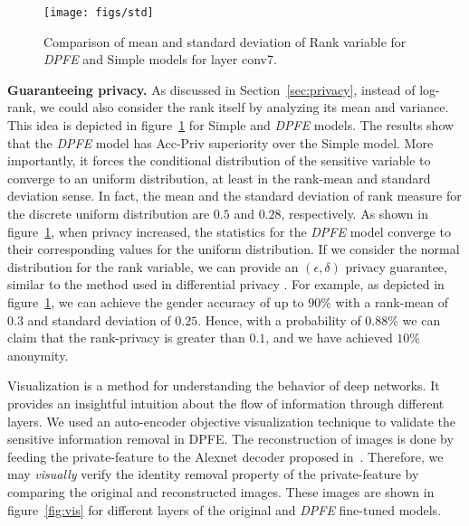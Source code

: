 \documentclass[10pt,journal,compsoc]{IEEEtran}
\begin{document}
\begin{figure}[!h]
	\centering
	\texttt{[image: figs/std]}
	\caption{Comparison of mean and standard deviation of Rank variable for \emph{DPFE} and Simple models for layer conv7.}
	\label{fig:std_comparison}
\end{figure}\textbf{Guaranteeing privacy.} As discussed in Section~\ref{sec:privacy}, instead of log-rank, we could also consider the rank itself by analyzing its mean and variance. This idea is depicted in figure~\ref{fig:std_comparison} for Simple and \emph{DPFE} models. The results show that the \emph{DPFE} model has Acc-Priv superiority over the Simple model. More importantly, it forces the conditional distribution of the sensitive variable to converge to an uniform distribution, at least in the rank-mean and standard deviation sense. In fact, the mean and the standard deviation of rank measure for the discrete uniform distribution are $0.5$ and $0.28$, respectively. As shown in figure~\ref{fig:std_comparison}, when privacy increased, the statistics for the \emph{DPFE} model converge to their corresponding values for the uniform distribution. If we consider the normal distribution for the rank variable, we can provide an $(\epsilon,\delta)$ privacy guarantee, similar to the method used in differential privacy \cite{dwork06}. For example, as depicted in figure~\ref{fig:std_comparison}, we can achieve the gender accuracy of up to $90\%$ with a rank-mean of $0.3$ and standard deviation of $0.25$. Hence, with a probability of $0.88\%$ we can claim that the rank-privacy is greater than $0.1$, and we have achieved $10\%$ anonymity.


Visualization is a method for understanding the behavior of deep networks. It provides an insightful intuition about the flow of information through different layers. We used an auto-encoder objective visualization technique \cite{dosovitskiy2016} to validate the sensitive information removal in DPFE. %
The reconstruction of images is done by feeding the private-feature to the Alexnet decoder proposed in~\cite{dosovitskiy2016}. Therefore, we may \emph{visually} verify the identity removal property of the private-feature by comparing the original and reconstructed images. These images are shown in figure~\ref{fig:vis} for different layers of the original and \emph{DPFE} fine-tuned models. 
\end{document}
